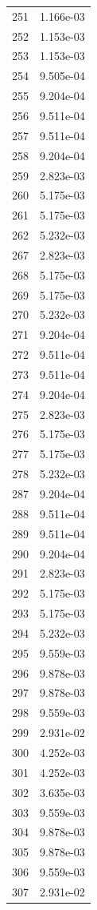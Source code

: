 \documentclass[12pt]{article}
\begin{document}
\begin{longtable}{@{}cc@{}}
251 & 1.166e-03 \\
252 & 1.153e-03 \\
253 & 1.153e-03 \\
254 & 9.505e-04 \\
255 & 9.204e-04 \\
256 & 9.511e-04 \\
257 & 9.511e-04 \\
258 & 9.204e-04 \\
259 & 2.823e-03 \\
260 & 5.175e-03 \\
261 & 5.175e-03 \\
262 & 5.232e-03 \\
267 & 2.823e-03 \\
268 & 5.175e-03 \\
269 & 5.175e-03 \\
270 & 5.232e-03 \\
271 & 9.204e-04 \\
272 & 9.511e-04 \\
273 & 9.511e-04 \\
274 & 9.204e-04 \\
275 & 2.823e-03 \\
276 & 5.175e-03 \\
277 & 5.175e-03 \\
278 & 5.232e-03 \\
287 & 9.204e-04 \\
288 & 9.511e-04 \\
289 & 9.511e-04 \\
290 & 9.204e-04 \\
291 & 2.823e-03 \\
292 & 5.175e-03 \\
293 & 5.175e-03 \\
294 & 5.232e-03 \\
295 & 9.559e-03 \\
296 & 9.878e-03 \\
297 & 9.878e-03 \\
298 & 9.559e-03 \\
299 & 2.931e-02 \\
300 & 4.252e-03 \\
301 & 4.252e-03 \\
302 & 3.635e-03 \\
303 & 9.559e-03 \\
304 & 9.878e-03 \\
305 & 9.878e-03 \\
306 & 9.559e-03 \\
307 & 2.931e-02 \\

\end{longtable}
\end{document}
